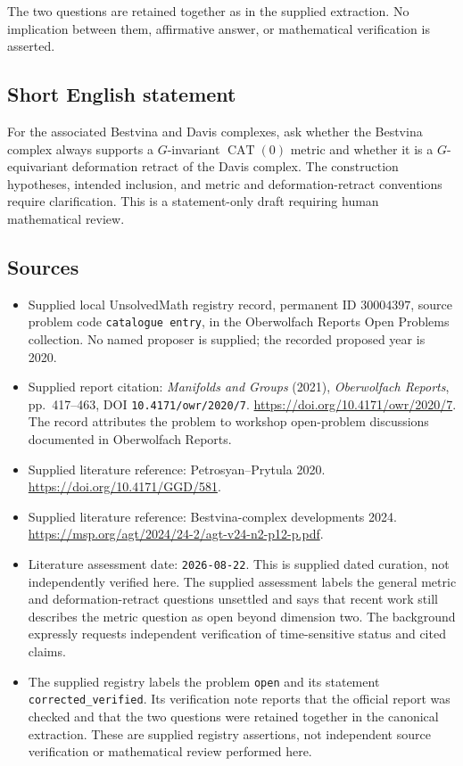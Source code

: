 \documentclass[11pt]{article}
\begin{document}
The two questions are retained together as in the supplied extraction. No implication between them, affirmative answer, or mathematical verification is asserted.
\subsection{Short English statement}
For the associated Bestvina and Davis complexes, ask whether the Bestvina complex always supports a \(G\)-invariant \(\operatorname{CAT}(0)\) metric and whether it is a \(G\)-equivariant deformation retract of the Davis complex. The construction hypotheses, intended inclusion, and metric and deformation-retract conventions require clarification. This is a statement-only draft requiring human mathematical review.
\subsection{Sources}
\begin{itemize}
\item Supplied local UnsolvedMath registry record, permanent ID \(30004397\), source problem code \texttt{catalogue entry}, in the Oberwolfach Reports Open Problems collection. No named proposer is supplied; the recorded proposed year is 2020.
\item Supplied report citation: \emph{Manifolds and Groups} (2021), \emph{Oberwolfach Reports}, pp.\ 417--463, DOI \texttt{10.4171/owr/2020/7}. \url{https://doi.org/10.4171/owr/2020/7}. The record attributes the problem to workshop open-problem discussions documented in Oberwolfach Reports.
\item Supplied literature reference: Petrosyan--Prytula 2020. \url{https://doi.org/10.4171/GGD/581}.
\item Supplied literature reference: Bestvina-complex developments 2024. \url{https://msp.org/agt/2024/24-2/agt-v24-n2-p12-p.pdf}.
\item Literature assessment date: \texttt{2026-08-22}. This is supplied dated curation, not independently verified here. The supplied assessment labels the general metric and deformation-retract questions unsettled and says that recent work still describes the metric question as open beyond dimension two. The background expressly requests independent verification of time-sensitive status and cited claims.
\item The supplied registry labels the problem \texttt{open} and its statement \texttt{corrected\_verified}. Its verification note reports that the official report was checked and that the two questions were retained together in the canonical extraction. These are supplied registry assertions, not independent source verification or mathematical review performed here.
\end{itemize}
\end{document}
